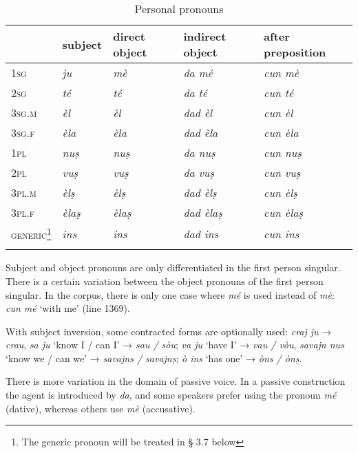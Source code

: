 \begin{table}
\caption{Personal pronouns}
\label{tab:perspron}
 \begin{tabular}{lllll}
  \lsptoprule
 &  subject & direct object & indirect object & after preposition\\
  \midrule
\textsc{1sg} & \textit{ju} & \textit{mè} & \textit{da mé} & \textit{cun mè} \\
\textsc{2sg} & \textit{té} & \textit{té} & \textit{da té} & \textit{cun té}\\
\textsc{3sg.m} & \textit{èl} & \textit{èl} & \textit{dad èl} & \textit{cun èl} \\
\textsc{3sg.f} & \textit{èla} & \textit{èla} & \textit{dad èla} & \textit{cun èla}\\
\textsc{1pl} & \textit{nuṣ} & \textit{nuṣ} & \textit{da nuṣ} & \textit{cun nuṣ}\\
\textsc{2pl} & \textit{vuṣ} & \textit{vuṣ} & \textit{da vuṣ} & \textit{cun vuṣ}\\
\textsc{3pl.m} & \textit{èlṣ} & \textit{èlṣ} & \textit{dad èlṣ} & \textit{cun èlṣ}\\
\textsc{3pl.f} & \textit{èlaṣ} & \textit{èlaṣ} & \textit{dad èlaṣ} & \textit{cun èlaṣ}\\
\textsc{generic}\footnote{The generic pronoun will be treated in § 3.7 below} & \textit{ins} & \textit{ins} & \textit{dad ins} & \textit{cun ins}\\
 \lspbottomrule
 \end{tabular}
\end{table}

Subject and object pronouns are only differentiated in the first person singular. There is a certain variation between the object pronouns of the first person singular. In the corpus, there is only one case where \textit{mé} is used instead of \textit{mè}: \textit{cun mé} `with me' (line 1369).

With subject inversion, some contracted forms are optionally used: \textit{craj ju} → \textit{crau}, \textit{sa ju} `know I / can I' → \textit{sau / sòu}; \textit{va ju} `have I' → \textit{vau / vòu}, \textit{savajn nus} `know we / can we' → \textit{savajns / savajnṣ}; \textit{ò ins} `has one' → \textit{òns / ònṣ}.

There is more variation in the domain of passive voice. In a passive construction the agent is introduced by \textit{da}, and some speakers prefer using the pronoun \textit{mé} (dative), whereas others use \textit{mè} (accusative).

